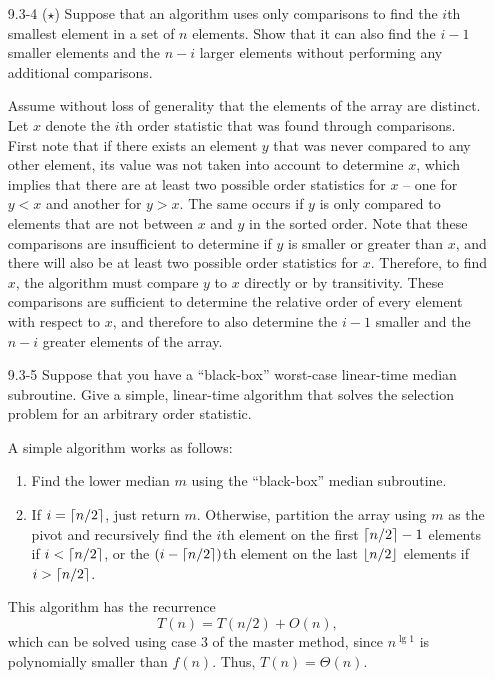 \begin{enumerate}
\item[9.3-4]{($\star$) Suppose that an algorithm uses only comparisons to find
the $i$th smallest element in a set of $n$ elements. Show that it can also find
the $i - 1$ smaller elements and the $n - i$ larger elements without performing
any additional comparisons.}

\begin{framed}
Assume without loss of generality that the elements of the array are distinct.
Let $x$ denote the $i$th order statistic that was found through comparisons.
First note that if there exists an element $y$ that was never compared to any
other element, its value was not taken into account to determine $x$, which
implies that there are at least two possible order statistics for $x$ {--} one
for $y < x$ and another for $y > x$. The same occurs if $y$ is only compared to
elements that are not between $x$ and $y$ in the sorted order. Note that these
comparisons are insufficient to determine if $y$ is smaller or greater than $x$,
and there will also be at least two possible order statistics for $x$.
Therefore, to find $x$, the algorithm must compare $y$ to $x$ directly or by
transitivity. These comparisons are sufficient to determine the relative order
of every element with respect to $x$, and therefore to also determine the
$i - 1$ smaller and the $n - i$ greater elements of the array.
\end{framed}

\newpage

\item[9.3-5]{Suppose that you have a ``black-box'' worst-case linear-time median
subroutine. Give a simple, linear-time algorithm that solves the selection
problem for an arbitrary order statistic.}

\begin{framed}
A simple algorithm works as follows:
\begin{enumerate}
\item Find the lower median $m$ using the ``black-box'' median subroutine.
\item If $i = \lceil n/2\rceil$, just return $m$. Otherwise, partition the array using
$m$ as the pivot and recursively find the $i$th element on the first
$\lceil n / 2\rceil - 1$ elements if $i < \lceil n / 2\rceil$, or the $(i - \lceil n / 2\rceil)$th
element on the last $\lfloor n/2\rfloor$ elements if $i > \lceil n/2\rceil$.
\end{enumerate}

This algorithm has the recurrence
\[
  T(n) = T(n/2) + O(n),
\]
which can be solved using case 3 of the master method, since $n^{\lg 1}$ is
polynomially smaller than $f(n)$. Thus, $T(n) = \Theta(n)$.


\end{framed}
\end{enumerate}
